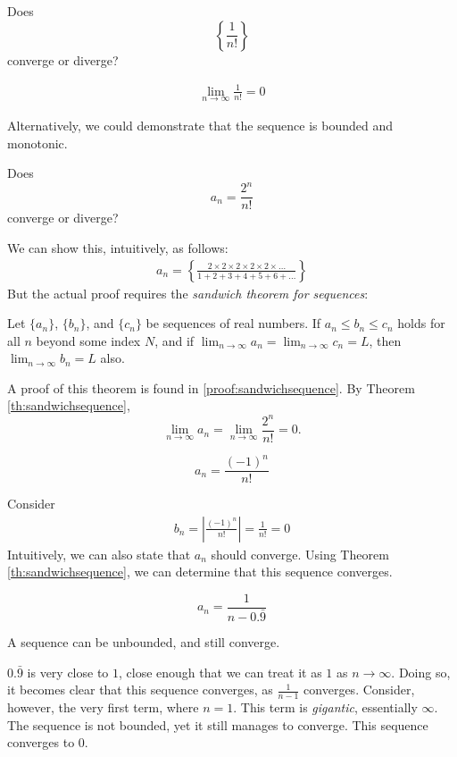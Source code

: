 \begin{ex}
  Does
  \[ \left\{ \frac{1}{n!} \right\} \]
  converge or diverge?
  \begin{sol}
      \begin{align*}
        \lim_{n \to \infty} \frac{1}{n!} = 0
      \end{align*}
  \end{sol}
  Alternatively, we could demonstrate that the sequence is bounded and monotonic.
\end{ex}
\begin{ex}
  Does
  \[ a_n = \frac{2^n}{n!} \]
  converge or diverge?
  \begin{sol}
    We can show this, intuitively, as follows:
    \begin{align*}
      a_n = \left\{
        \frac{2\times2\times2\times2\times2\times\ldots}{1+2+3+4+5+6+\ldots} \right\}
    \end{align*}
    But the actual proof requires the \emph{sandwich theorem for
    sequences}\cite[p.~536]{thomas}:
    \begin{theorem}\label{th:sandwichsequence}
      Let $\{a_n\}$, $\{b_n\}$, and $\{c_n\}$ be sequences of real numbers. If
      $a_n \leq b_n \leq c_n $ holds for all $n$ beyond some index $N$, and if
      $\lim_{n\to\infty} a_n = \lim_{n\to\infty} c_n = L$, then
      $\lim_{n\to\infty} b_n = L$ also.
    \end{theorem}
      A proof of this theorem is found in \ref{proof:sandwichsequence}.
      By Theorem \ref{th:sandwichsequence}, \[\lim_{n \to \infty} a_n =
      \lim_{n\to\infty}\frac{2^n}{n!}=0.\]
  \end{sol}
\end{ex}
\begin{ex}
  \[ a_n = \frac{(-1)^n}{n!} \]
  \begin{sol}
    Consider
    \begin{align*}
      b_n = \left| \frac{(-1)^n}{n!} \right| = \frac{1}{n!} = 0
    \end{align*}
    Intuitively, we can also state that $a_n$ should converge.
    Using Theorem \ref{th:sandwichsequence}, we can determine that this sequence converges.
  \end{sol}
\end{ex}
\begin{ex}
  \[ a_n = \frac{1}{n-0.\bar{9}} \]
  \begin{sol}
    A sequence can be unbounded, and still converge.

    $0.\bar{9}$ is very close to $1$, close enough that we can treat it as $1$ as $n\to\infty$.
    Doing so, it becomes clear that this sequence converges, as $\frac{1}{n-1}$ converges.
    Consider, however, the very first term, where $n=1$.
    This term is \emph{gigantic}, essentially \(\infty\).
    The sequence is not bounded, yet it still manages to converge.
    This sequence converges to \(0\).
  \end{sol}
\end{ex}
